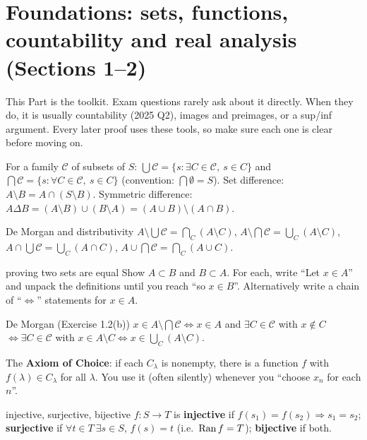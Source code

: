 \section{Foundations: sets, functions, countability and real analysis (Sections 1--2)}

\begin{plain}
This Part is the toolkit. Exam questions rarely ask about it directly. When they do, it is
usually countability (2025 Q2), images and preimages, or a sup/inf argument. Every later
proof uses these tools, so make sure each one is clear before moving on.
\end{plain}

For a family $\mathcal C$ of subsets of $S$:
$\bigcup\mathcal C=\{s:\exists C\in\mathcal C,\ s\in C\}$ and
$\bigcap\mathcal C=\{s:\forall C\in\mathcal C,\ s\in C\}$
(convention: $\bigcap\emptyset=S$). Set difference: $A\setminus B=A\cap(S\setminus B)$.
Symmetric difference: $A\Delta B=(A\setminus B)\cup(B\setminus A)=(A\cup B)\setminus(A\cap B)$.

\begin{thm}{De Morgan and distributivity}
$A\setminus\bigcup\mathcal C=\bigcap_{C}(A\setminus C)$,\quad
$A\setminus\bigcap\mathcal C=\bigcup_{C}(A\setminus C)$,\quad
$A\cap\bigcup\mathcal C=\bigcup_C(A\cap C)$,\quad
$A\cup\bigcap\mathcal C=\bigcap_C(A\cup C)$.
\end{thm}

\begin{steps}{proving two sets are equal}
Show $A\subset B$ and $B\subset A$. For each, write ``Let $x\in A$'' and unpack the definitions
until you reach ``so $x\in B$''. Alternatively write a chain of ``$\iff$'' statements for
$x\in A$.
\end{steps}

\begin{example}{De Morgan (Exercise 1.2(b))}
$x\in A\setminus\bigcap\mathcal C\iff x\in A$ and $\exists C\in\mathcal C$ with $x\notin C$
$\iff \exists C\in\mathcal C$ with $x\in A\setminus C \iff x\in\bigcup_C(A\setminus C)$.
\end{example}

The \textbf{Axiom of Choice}: if each $C_\lambda$ is nonempty, there is a function $f$ with
$f(\lambda)\in C_\lambda$ for all $\lambda$. You use it (often silently) whenever you ``choose
$x_n$ for each $n$''.

\begin{defn}{injective, surjective, bijective}
$f:S\to T$ is \textbf{injective} if $f(s_1)=f(s_2)\Rightarrow s_1=s_2$;
\textbf{surjective} if $\forall t\in T\ \exists s\in S$, $f(s)=t$ (i.e.\ $\operatorname{Ran} f=T$);
\textbf{bijective} if both.
\end{defn}

